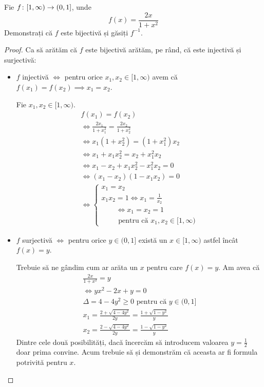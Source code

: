 \begin{exercise}
Fie \(f \colon [1, \infty) \to (0, 1]\), unde
\[
    f(x) = \frac{2x}{1+x^2}
\]
Demonstrați că \(f\) este bijectivă și găsiți \(f^{-1}\).
\end{exercise}
\begin{proof}
Ca să arătăm că \(f\) este bijectivă arătăm, pe rând, că este injectivă și surjectivă:
\begin{itemize}
    \item \(f\) injectivă \(\iff\) pentru orice \(x_1, x_2 \in [1, \infty)\) avem că \(f(x_1) = f(x_2) \implies x_1 = x_2\).
    
    Fie \(x_1, x_2 \in [1, \infty)\).
    \begin{gather*}
        f(x_1) = f(x_2) \\
        \iff \frac{2x_1}{1 + x_1^2} = \frac{2x_2}{1 + x_2^2} \\
        \iff x_1 (1 + x_2^2) = (1 + x_1^2) x_2 \\
        \iff x_1 + x_1 x_2^2 = x_2 + x_1^2 x_2 \\
        \iff x_1 - x_2 + x_1 x_2^2 - x_1^2 x_2 = 0 \\
        \iff (x_1 - x_2)(1 - x_1 x_2) = 0 \\
        \iff \begin{cases}
        x_1 = x_2 \\
        x_1 x_2 = 1 \iff x_1 = \frac{1}{x_2} \\
        \qquad \iff x_1 = x_2 = 1 \\
        \qquad \text{ pentru că } x_1, x_2 \in [1, \infty)
        \end{cases}
    \end{gather*}
    \item \(f\) surjectivă \(\iff\) pentru orice \(y \in (0, 1]\) există un \(x \in [1, \infty)\) astfel încât \(f(x) = y\).
     
    Trebuie să ne gândim cum ar arăta un \(x\) pentru care \(f(x) = y\). Am avea că
    \begin{gather*}
        \frac{2x}{1 + x^2} = y \\
        \iff yx^2 - 2x + y = 0 \\
        \Delta = 4 - 4y^2 \geq 0 \text{ pentru că } y \in (0, 1] \\
        x_1 = \frac{2 + \sqrt{4 - 4y^2}}{2y} = \frac{1 + \sqrt{1 - y^2}}{y} \\
        x_2 = \frac{2 - \sqrt{4 - 4y^2}}{2y} = \frac{1 - \sqrt{1 - y^2}}{y}
    \end{gather*}
    Dintre cele două posibilități, dacă încercăm să introducem valoarea \(y = \frac{1}{2}\) doar prima convine. Acum trebuie să și demonstrăm că aceasta ar fi formula potrivită pentru \(x\).
     

\end{itemize}
\end{proof}
